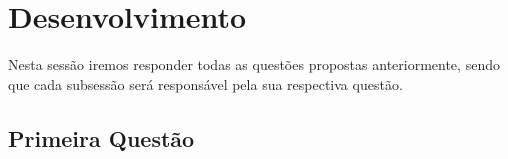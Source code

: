 \chapter[Desenvolvimento ]{Desenvolvimento}

Nesta sessão iremos responder todas as questões propostas anteriormente, sendo
que cada subsessão será responsável pela sua respectiva questão.

\section{Primeira Questão}
\label{sec:Primeira Questão}


